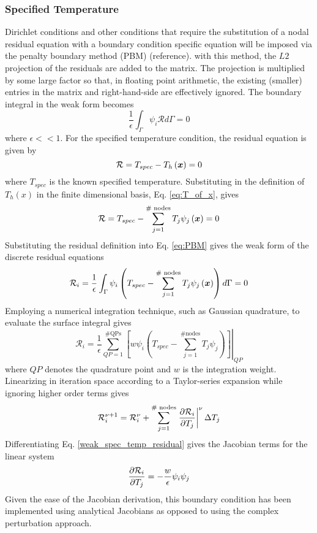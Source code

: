 \subsubsection{Specified Temperature}
Dirichlet conditions and other conditions that require the substitution of a nodal residual equation with a boundary condition specific equation will be imposed via the penalty boundary method (PBM) (reference). with this method, the $L2$ projection of the residuals are added to the matrix. The projection is multiplied by some large factor so that, in floating point arithmetic, the existing (smaller) entries in the matrix and right-hand-side are effectively ignored. The boundary integral in the weak form becomes
\begin{equation}
  \frac{1}{\epsilon} \int_{\Gamma} \psi_{i} \mathcal{R} d\Gamma = 0
  \label{eq:PBM}
\end{equation}
where $\epsilon << 1$. For the specified temperature condition, the residual equation is given by
\begin{equation}
  \mathcal{R} = T_{spec} - T_{h}\left({\boldsymbol{x}}\right) = 0
\end{equation}
where $T_{spec}$ is the known specified temperature. Substituting in the definition of $T_{h}\left(x\right)$ in the finite dimensional basis, Eq. \ref{eq:T_of_x}, gives
\begin{equation}
  \mathcal{R} = T_{spec} - \sum_{j=1}^{\text{\# nodes}} T_{j} \psi_{j}\left({\boldsymbol{x}}\right) = 0
\end{equation}
Substituting the residual definition into Eq. \ref{eq:PBM} gives the weak form of the discrete residual equations
\begin{equation}
\mathcal{R}_{i} = \frac{1}{\epsilon} \int_{\Gamma} \psi_{i} \left( T_{spec} - \sum_{j=1}^{\text{\# nodes}} T_{j} \psi_{j}\left({\boldsymbol{x}}\right) \right) d\Gamma = 0
\end{equation}
Employing a numerical integration technique, such as Gaussian quadrature, to evaluate the surface integral gives
\begin{equation}
  \mathcal{R}_{i} = \frac{1}{\epsilon} \sum_{QP=1}^{\text{\# QPs}} \left. \left[ w \psi_{i} \left( T_{spec} - \sum_{j=1}^{\text{\# nodes}} T_{j} \psi_{j} \right) \right]\right\vert_{QP}
\label{weak_spec_temp_residual}
\end{equation}
where $QP$ denotes the quadrature point and $w$ is the integration weight.
Linearizing in iteration space according to a Taylor-series expansion while ignoring higher order terms gives
\begin{equation}
  \mathcal{R}^{\nu+1}_{i} = \mathcal{R}^{\nu}_{i} + \sum_{j=1}^{\text{\# nodes}} \left. {\frac{\partial{\mathcal{R}_{i}}}{\partial{T_{j}}}}\right\vert^{\nu}\Delta T_{j}
\end{equation}
Differentiating Eq. \ref{weak_spec_temp_residual} gives the Jacobian terms for the linear system
\begin{equation}
  {\frac{\partial{\mathcal{R}_{i}}}{\partial{T_{j}}}} = -\frac{w}{\epsilon} \psi_{i} \psi_{j}
\end{equation}
Given the ease of the Jacobian derivation, this boundary condition has been implemented using analytical Jacobians as opposed to using the complex perturbation approach.
